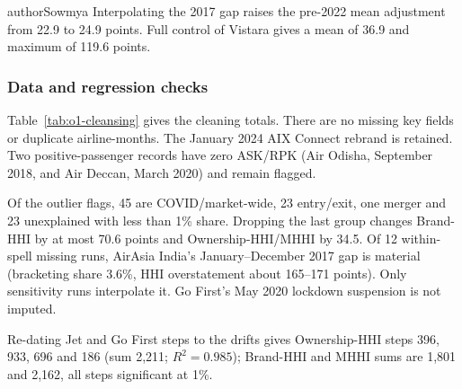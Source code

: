 \begin{mergedcontribution}{authorSowmya}
Interpolating the 2017 gap raises the pre-2022 mean adjustment from 22.9 to 24.9 points. Full control of Vistara gives a mean of 36.9 and maximum of 119.6 points.

\subsubsection{Data and regression checks}
\label{app:o1-cleaning}
Table~\ref{tab:o1-cleansing} gives the cleaning totals. There are no missing key fields or duplicate airline-months. The January 2024 AIX Connect rebrand is retained. Two positive-passenger records have zero ASK/RPK (Air Odisha, September 2018, and Air Deccan, March 2020) and remain flagged.

Of the outlier flags, 45 are COVID/market-wide, 23 entry/exit, one merger and 23 unexplained with less than 1\% share. Dropping the last group changes Brand-HHI by at most 70.6 points and Ownership-HHI/MHHI by 34.5. Of 12 within-spell missing runs, AirAsia India's January--December 2017 gap is material (bracketing share 3.6\%, HHI overstatement about 165--171 points). Only sensitivity runs interpolate it. Go First's May 2020 lockdown suspension is not imputed.


\label{app:o1-cr2}
\label{app:o1-robust}
Re-dating Jet and Go First steps to the drifts gives Ownership-HHI steps 396, 933, 696 and 186 (sum 2,211; $R^2=0.985$); Brand-HHI and MHHI sums are 1,801 and 2,162, all steps significant at 1\%.


\end{mergedcontribution}
